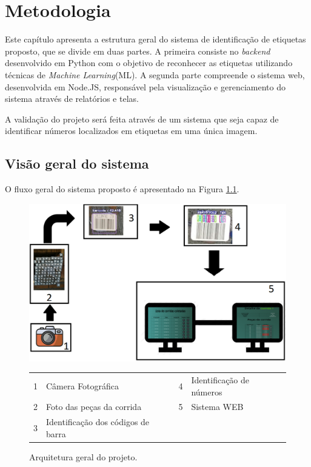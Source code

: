  \chapter{Metodologia}
 
Este capítulo apresenta a estrutura geral do sistema de identificação de etiquetas proposto, que se divide em duas partes. A primeira consiste no \textit{backend} desenvolvido em Python com o objetivo de reconhecer as etiquetas utilizando técnicas de \textit{Machine Learning}(ML). A segunda parte compreende o sistema web, desenvolvida em Node.JS, responsável pela visualização e gerenciamento do sistema através de relatórios e telas.

A validação do projeto será feita através de um sistema que seja capaz de identificar números localizados em etiquetas em uma única imagem.


\section{Visão geral do sistema} \label{sec:funcionamento}

O fluxo geral do sistema proposto é apresentado na Figura \ref{fig:arqgeral}.

\begin{figure}[H]
	\centering
	\includegraphics[width=1\linewidth]{capitulos/FluxoDoProjeto.png}
	\caption{Arquitetura geral do projeto.}
	\begin{tabular}{r@{: }l r@{: }l}
    1 & Câmera Fotográfica & 4 & Identificação de números \\
    2& Foto das peças da corrida & 5 & Sistema WEB \\
    3 & Identificação dos códigos de  barra
    \end{tabular}
	\label{fig:arqgeral}
\end{figure}

